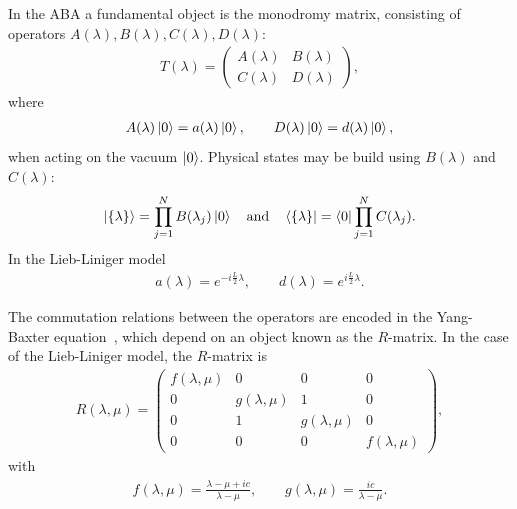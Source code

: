 \documentclass[11pt, a4paper]{report} %
\begin{document}
In the ABA a fundamental object is the monodromy matrix, consisting of operators \(A(\lambda), B(\lambda), C(\lambda), D(\lambda)\):
\begin{align}
  \label{eq:31}
  T(\lambda) =
  \begin{pmatrix}
    A(\lambda) & B(\lambda) \\
    C(\lambda) & D(\lambda)
  \end{pmatrix},
\end{align}
where 
\begin{align}
  \label{eq:36}
  A(\lambda) \ket{0} = a(\lambda)\ket{0},\qquad D(\lambda) \ket{0} = d(\lambda)\ket{0},
\end{align}
when acting on the vacuum \(\ket{0}\).
Physical states may be build using \(B(\lambda)\) and \(C(\lambda)\):
\begin{align}
  \label{eq:42}
  \ket{\{\lambda\}} = \prod_{j=1}^{N} B(\lambda_j) \ket{0} \quad \mathrm{and} \quad \bra{\{\lambda\}} = \bra{0} \prod_{j=1}^N C(\lambda_j).
\end{align}
In the Lieb-Liniger model~\cite{Piroli2015}
\begin{align}
  \label{eq:43}
  a(\lambda) = e^{-i\frac{L}{2}\lambda}, \qquad d(\lambda) = e^{i\frac{L}{2}\lambda}.
\end{align}

The commutation relations between the operators are encoded in the Yang-Baxter equation~\cite{Korepin1993}, which depend on an object known as the \(R\)-matrix.
In the case of the Lieb-Liniger model, the \(R\)-matrix is
\begin{align}
  \label{eq:45}
  R(\lambda,\mu) = 
  \begin{pmatrix}
    f(\lambda, \mu) & 0 & 0 & 0\\
    0 & g(\lambda, \mu) & 1 & 0\\
    0 & 1 & g(\lambda, \mu) & 0 \\
    0 & 0 & 0 & f(\lambda,\mu)
  \end{pmatrix},
\end{align}
with
\begin{align}
  \label{eq:46}
  f(\lambda,\mu) = \frac{\lambda-\mu+ic}{\lambda-\mu}, \qquad g(\lambda,\mu) = \frac{ic}{\lambda-\mu}.
\end{align}
\end{document}
